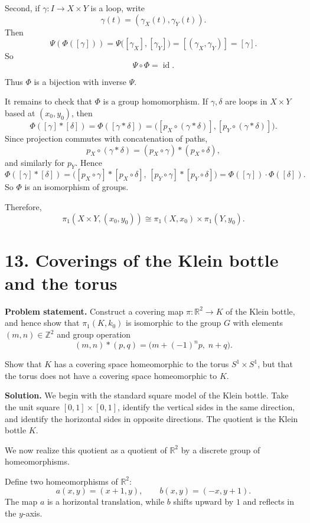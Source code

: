\documentclass[12pt,a4paper]{article}
\theoremstyle{notespace}
\begin{document}
Second, if \(\gamma:I\to X\times Y\) is a loop, write
\[
\gamma(t)=(\gamma_X(t),\gamma_Y(t)).
\]
Then
\[
\Psi(\Phi([\gamma]))
=
\Psi\bigl([\gamma_X],[\gamma_Y]\bigr)
=
[(\gamma_X,\gamma_Y)]
=
[\gamma].
\]
So
\[
\Psi\circ\Phi=\operatorname{id}.
\]

Thus \(\Phi\) is a bijection with inverse \(\Psi\).

It remains to check that \(\Phi\) is a group homomorphism. If \(\gamma,\delta\) are loops in \(X\times Y\) based at \((x_0,y_0)\), then
\[
\Phi([\gamma]*[\delta])
=
\Phi([\gamma * \delta])
=
\bigl([p_X\circ(\gamma * \delta)],[p_Y\circ(\gamma * \delta)]\bigr).
\]
Since projection commutes with concatenation of paths,
\[
p_X\circ(\gamma * \delta)=(p_X\circ\gamma)*(p_X\circ\delta),
\]
and similarly for \(p_Y\). Hence
\[
\Phi([\gamma]*[\delta])
=
\bigl([p_X\circ\gamma]*[p_X\circ\delta],\,
[p_Y\circ\gamma]*[p_Y\circ\delta]\bigr)
=
\Phi([\gamma])\cdot\Phi([\delta]).
\]
So \(\Phi\) is an isomorphism of groups.

Therefore,
\[
\pi_1(X\times Y,(x_0,y_0))
\cong
\pi_1(X,x_0)\times \pi_1(Y,y_0).
\]

\bigskip

\section{13. Coverings of the Klein bottle and the torus}

\textbf{Problem statement.} Construct a covering map \(\pi:\mathbb R^2\to K\) of the Klein bottle, and hence show that \(\pi_1(K,k_0)\) is isomorphic to the group \(G\) with elements \((m,n)\in\mathbb Z^2\) and group operation
\[
(m,n)*(p,q)=\bigl(m+(-1)^n p,\; n+q\bigr).
\]

Show that \(K\) has a covering space homeomorphic to the torus \(S^1\times S^1\), but that the torus does not have a covering space homeomorphic to \(K\).

\textbf{Solution.}
We begin with the standard square model of the Klein bottle. Take the unit square \([0,1]\times[0,1]\), identify the vertical sides in the same direction, and identify the horizontal sides in opposite directions. The quotient is the Klein bottle \(K\).

We now realize this quotient as a quotient of \(\mathbb R^2\) by a discrete group of homeomorphisms.

Define two homeomorphisms of \(\mathbb R^2\):
\[
a(x,y)=(x+1,y),
\qquad
b(x,y)=(-x,y+1).
\]
The map \(a\) is a horizontal translation, while \(b\) shifts upward by \(1\) and reflects in the \(y\)-axis.
\end{document}
